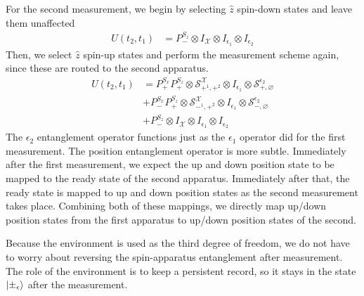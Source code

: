For the second measurement, we begin by selecting $\hat{z}$ spin-down states and leave them unaffected
\begin{align}
  U(t_2, t_1) &=  P^{S_z}_- \otimes I_\mathcal{X} \otimes I_{\epsilon_1} \otimes I_{\epsilon_2}
\end{align}
Then, we select $\hat{z}$ spin-up states and perform the measurement scheme again, since these are routed to the second apparatus.
\begin{align}
  U(t_2, t_1) &= P^{S_x}_+ P^{S_z}_+ \otimes \mathcal{S}^\mathcal{X}_{+^1, +^2} \otimes I_{\epsilon_1} \otimes \mathcal{S}^{\epsilon_2}_{+, \varnothing} \\ \nonumber
  &+ P^{S_x}_- P^{S_z}_+ \otimes \mathcal{S}^\mathcal{X}_{-^1, +^2} \otimes I_{\epsilon_1} \otimes \mathcal{S}^{\epsilon_2}_{-, \varnothing} \\ \nonumber
  &+ P^{S_z}_- \otimes I_\mathcal{X} \otimes I_{\epsilon_1} \otimes I_{\epsilon_2}
\end{align}
The $\epsilon_2$ entanglement operator functions just as the $\epsilon_1$ operator did for the first measurement. The position entanglement operator is more subtle. Immediately after the first measurement, we expect the up and down position state to be mapped to the ready state of the second apparatus. Immediately after that, the ready state is mapped to up and down position states as the second measurement takes place. Combining both of these mappings, we directly map up/down position states from the first apparatus to up/down position states of the second.

Because the environment is used as the third degree of freedom, we do not have to worry about reversing the spin-apparatus entanglement after measurement. The role of the environment is to keep a persistent record, so it stays in the state $\ket{\pm_\epsilon}$ after the measurement.

